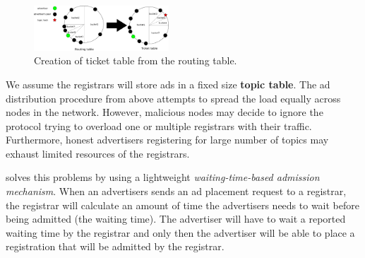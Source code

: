 \begin{figure}
    \includegraphics[width=0.45\textwidth]{img/ticket_table}
    \caption{Creation of ticket table from the routing table.}
    \label{fig:ticket_table}
 \end{figure}
 
  We assume the registrars will store ads in a fixed size \textbf{topic table}. The ad distribution procedure from above attempts to spread the load equally across nodes in the network. 
However, malicious nodes may decide to ignore the protocol trying to overload one or multiple registrars with their traffic. 
Furthermore,  honest advertisers registering for large number of topics may exhaust limited resources of the registrars. 
 
 \sysname solves this problems by using a lightweight \textit{waiting-time-based admission mechanism}. When an advertisers sends an ad placement request to a registrar, the registrar will calculate an amount of time the advertisers needs to wait before being admitted (\ie the waiting time). 
The advertiser will have to wait a reported waiting time by the registrar and only then the advertiser will be able to place a registration that will be admitted by the registrar.
 
